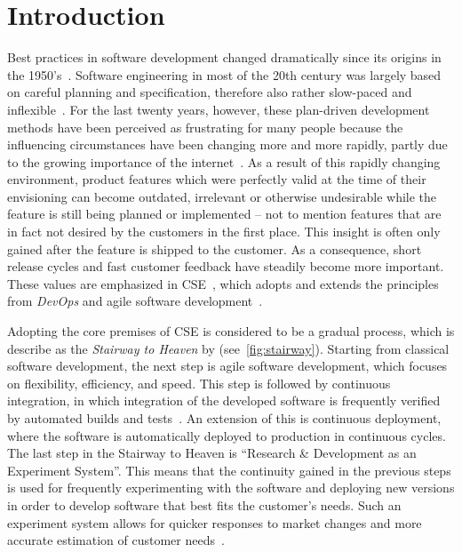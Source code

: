 %
\chapter{Introduction}
\label{ch:intro}





Best practices in software development changed dramatically since its origins in the 1950's~\cite{boehm2006view}.
Software engineering in most of the 20th century was largely based on careful planning and specification, therefore also rather slow-paced and inflexible~\cite{boehm2006view}.
For the last twenty years, however, these plan-driven development methods have been perceived as frustrating for many people because the influencing circumstances have been changing more and more rapidly, partly due to the growing importance of the internet~\cite{Williams2003}.
As a result of this rapidly changing environment, product features which were perfectly valid at the time of their envisioning can become outdated, irrelevant or otherwise undesirable while the feature is still being planned or implemented -- not to mention features that are in fact not desired by the customers in the first place.
This insight is often only gained after the feature is shipped to the customer.
As a consequence, short release cycles and fast customer feedback have steadily become more important.
These values are emphasized in \acf{CSE}~\cite{Bosch2014}, which adopts and extends the principles from \emph{DevOps} and agile software development~\cite{Fitzgerald2017,fowler2001agile}.

Adopting the core premises of \ac{CSE} is considered to be a gradual process, which is describe as the \emph{Stairway to Heaven} by \citet{Olsson2012} (see~\cref{fig:stairway}).
Starting from classical software development, the next step is agile software development, which focuses on flexibility, efficiency, and speed.
This step is followed by continuous integration, in which integration of the developed software is frequently verified by automated builds and tests~\cite[Maintaining Model Integrity, pp.~341~ff.]{evans2004domain}.
An extension of this is continuous deployment, where the software is automatically deployed to production in continuous cycles.
The last step in the Stairway to Heaven is ``Research \& Development as an Experiment System''.
This means that the continuity gained in the previous steps is used for frequently experimenting with the software and deploying new versions in order to develop software that best fits the customer's needs.
Such an experiment system allows for quicker responses to market changes and more accurate estimation of customer needs~\cite{Olsson2012}.

